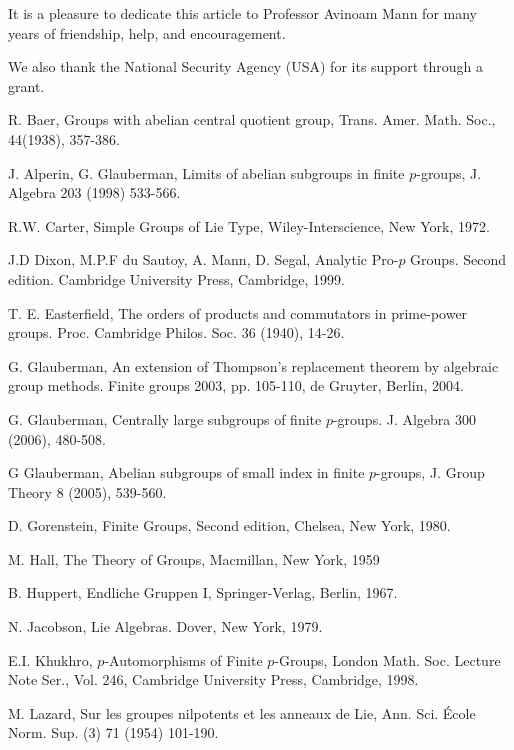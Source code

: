 \documentclass[mathscr]{amsart}
\theoremstyle{theorem}
\theoremstyle{definition}
\numberwithin{equation}{section}
\begin{document}
It is a pleasure to dedicate this article to Professor Avinoam Mann
for many years of friendship, help, and encouragement.

We also thank the National Security Agency (USA) for its support
through a grant.

\begin{thebibliography}{14}

 R. Baer, Groups with abelian central quotient group,
Trans. Amer. Math. Soc., 44(1938), 357-386.

 J. Alperin, G. Glauberman, Limits of abelian subgroups in finite $p$-groups,
J. Algebra 203 (1998) 533-566.

 R.W. Carter, Simple Groups of Lie Type,
Wiley-Interscience, New York, 1972.

 J.D Dixon, M.P.F du Sautoy, A. Mann,
 D. Segal, Analytic Pro-$p$ Groups. Second edition.
Cambridge University Press, Cambridge, 1999.

 T. E. Easterfield,  The orders of products and commutators in
prime-power groups. Proc. Cambridge Philos. Soc. 36 (1940), 14-26.

 G. Glauberman, An extension of Thompson's replacement
theorem by algebraic group methods. Finite groups 2003, pp. 105-110,
de Gruyter, Berlin, 2004.

 G. Glauberman, Centrally large subgroups of finite $p$-groups.
J. Algebra 300 (2006), 480-508.

 G Glauberman, Abelian subgroups of small index in finite
$p$-groups, J. Group Theory 8  (2005), 539-560.

 D. Gorenstein, Finite Groups, Second edition, Chelsea, New York, 1980.

 M. Hall, The Theory of Groups, Macmillan, New York, 1959

 B. Huppert, Endliche Gruppen I, Springer-Verlag, Berlin, 1967.

 N. Jacobson, Lie Algebras. Dover, New York, 1979.

 E.I. Khukhro, $p$-Automorphisms of Finite
$p$-Groups, London Math. Soc. Lecture Note Ser., Vol. 246, Cambridge
University Press, Cambridge, 1998.

 M. Lazard, Sur les groupes nilpotents et les anneaux de Lie, Ann.
Sci. \'Ecole Norm. Sup. (3) 71 (1954) 101-190.

\end{thebibliography}
\end{document}
